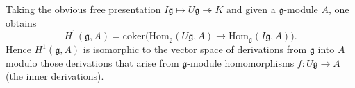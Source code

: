 Taking the obvious free presentation $I\mathfrak{g} \mapsto U\mathfrak{g} \twoheadrightarrow K$ and given a $\mathfrak{g}$-module $A$, one obtains
$$H^1(\mathfrak{g}, A) = \text{coker}\bigl(\text{Hom}_{\mathfrak{g}}(U\mathfrak{g}, A) \rightarrow \text{Hom}_{\mathfrak{g}}(I\mathfrak{g}, A)\bigr).$$
Hence $H^1(\mathfrak{g}, A)$ is isomorphic to the vector space of derivations from $\mathfrak{g}$ into $A$ modulo those derivations that arise from $\mathfrak{g}$-module homomorphisms $f: U\mathfrak{g} \rightarrow A$ (the inner derivations).
